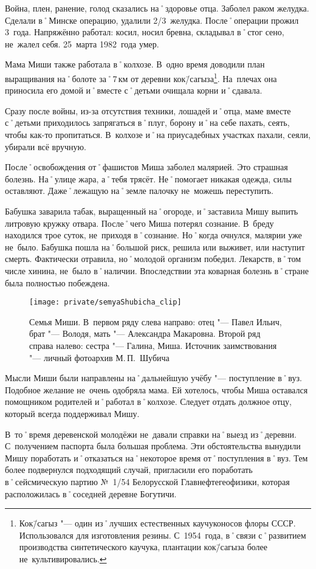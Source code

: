 Война, плен, ранение, голод сказались на˚здоровье отца. Заболел раком желудка. Сделали в˚Минске операцию, удалили 2/3~желудка. После˚операции прожил 3~года. Напряжённо работал: косил, носил бревна, складывал в˚стог сено, не~жалел себя. 25~марта 1982~года умер.

Мама Миши также работала в˚колхозе. В~одно время доводили план выращивания на˚болоте за˚7\,км от деревни кок\=/сагыза\footnote{Кок\=/сагыз "--- один из˚лучших естественных каучуконосов флоры СССР. Использовался для изготовления резины. С~1954~года, в˚связи с˚развитием производства синтетического каучука, плантации кок\=/сагыза более не~культивировались.}. На~плечах она приносила его домой и˚вместе с˚детьми очищала корни и˚сдавала.

Сразу после войны, из-за отсутствия техники, лошадей и˚отца, маме вместе с˚детьми приходилось запрягаться в˚плуг, борону и˚на себе пахать, сеять, чтобы как-то пропитаться. В~колхозе и˚на приусадебных участках пахали, сеяли, убирали всё вручную.

После˚освобождения от˚фашистов Миша заболел малярией. Это страшная болезнь. На˚улице жара, а˚тебя трясёт. Не˚помогает никакая одежда, силы оставляют. Даже˚лежащую на˚земле палочку не~можешь переступить. 

Бабушка заварила табак, выращенный на˚огороде, и˚заставила Мишу выпить литровую кружку отвара. После˚чего Миша потерял сознание. В~бреду находился трое суток, не~приходя в˚сознание. Но˚когда очнулся, малярии уже не~было. Бабушка пошла на˚большой риск, решила или выживет, или наступит смерть. Фактически отравила, но˚молодой организм победил. Лекарств, в˚том числе хинина, не~было в˚наличии. Впоследствии эта коварная болезнь в˚стране была полностью побеждена.

\begin{figure}[h]
\texttt{[image: private/semyaShubicha\_clip]}
\caption{Семья Миши. В~первом ряду слева направо: отец "--- Павел Ильич, брат "--- Володя, мать "--- Александра Макаровна. Второй ряд справа налево: сестра "--- Галина, Миша. Источник заимствования "--- личный фотоархив М.\,П.~Шубича}
\label{fig:semyaShubicha}
\end{figure}

Мысли Миши были направлены на˚дальнейшую учёбу "--- поступление в˚вуз. Подобное желание не~очень одобряла мама. Ей хотелось, чтобы Миша оставался помощником родителей и˚работал в˚колхозе. Следует отдать должное отцу, который всегда поддерживал Мишу. 

В~то˚время деревенской молодёжи не~давали справки на˚выезд из˚деревни. С~получением паспорта была большая проблема. Эти обстоятельства вынудили Мишу поработать и˚отказаться на˚некоторое время от˚поступления в˚вуз. Тем более подвернулся подходящий случай, пригласили его поработать в˚сейсмическую партию №~1/54 Белорусской Главнефтегеофизики, которая расположилась в˚соседней деревне Богутичи.

